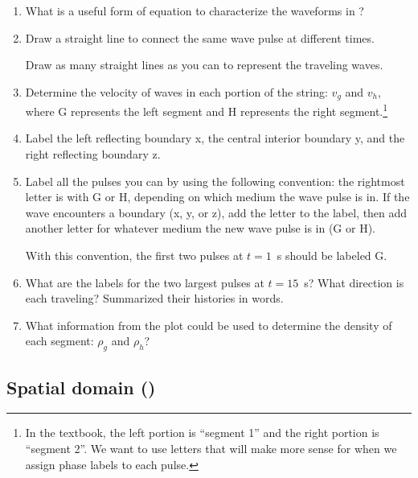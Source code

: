 \documentclass[11pt,titlepage,fleqn]{article}
\begin{document}
\begin{enumerate}
\item What is a useful form of equation to characterize the waveforms in ?

\item Draw a straight line to connect the same wave pulse at different times. 

Draw as many straight lines as you can to represent the traveling waves.

\item Determine the velocity of waves in each portion of the string: $v_g$ and $v_h$, where G represents the left segment and H represents the right segment.\footnote{In the textbook, the left portion is ``segment 1'' and the right portion is ``segment 2''. We want to use letters that will make more sense for when we assign phase labels to each pulse.}

\item Label the left reflecting boundary x, the central interior boundary y, and the right reflecting boundary z.

\item Label all the pulses you can by using the following convention: the rightmost letter is with G or H, depending on which medium the wave pulse is in. If the wave encounters a boundary (x, y, or z), add the letter to the label, then add another letter for whatever medium the new wave pulse is in (G or H).

With this convention, the first two pulses at $t=1$~s should be labeled G.

\item What are the labels for the two largest pulses at $t=15$~s? What direction is each traveling? Summarized their histories in words.

\item What information from the plot could be used to determine the density of each segment: $\rho_g$ and $\rho_h$?

\end{enumerate}


\subsection*{Spatial domain ()}
\end{document}
